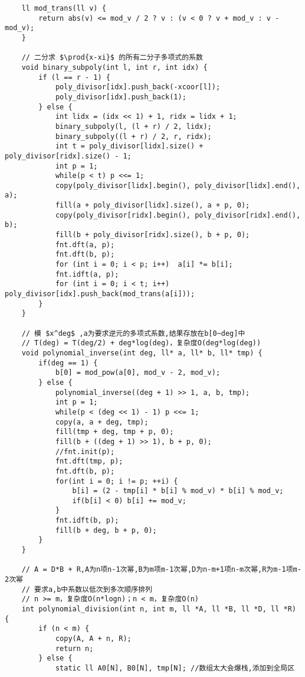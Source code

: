 \begin{verbatim}
    ll mod_trans(ll v) {
        return abs(v) <= mod_v / 2 ? v : (v < 0 ? v + mod_v : v - mod_v);
    }
    
    // 二分求 $\prod{x-xi}$ 的所有二分子多项式的系数
    void binary_subpoly(int l, int r, int idx) {
        if (l == r - 1) {
            poly_divisor[idx].push_back(-xcoor[l]);
            poly_divisor[idx].push_back(1);        
        } else {
            int lidx = (idx << 1) + 1, ridx = lidx + 1;
            binary_subpoly(l, (l + r) / 2, lidx);
            binary_subpoly((l + r) / 2, r, ridx);
            int t = poly_divisor[lidx].size() + poly_divisor[ridx].size() - 1;
            int p = 1;
            while(p < t) p <<= 1;
            copy(poly_divisor[lidx].begin(), poly_divisor[lidx].end(), a);
            fill(a + poly_divisor[lidx].size(), a + p, 0);
            copy(poly_divisor[ridx].begin(), poly_divisor[ridx].end(), b);
            fill(b + poly_divisor[ridx].size(), b + p, 0);
            fnt.dft(a, p);
            fnt.dft(b, p);
            for (int i = 0; i < p; i++)  a[i] *= b[i]; 
            fnt.idft(a, p);
            for (int i = 0; i < t; i++) poly_divisor[idx].push_back(mod_trans(a[i]));
        }
    }
    
    // 模 $x^deg$ ,a为要求逆元的多项式系数,结果存放在b[0~deg]中
    // T(deg) = T(deg/2) + deg*log(deg)，复杂度O(deg*log(deg))
    void polynomial_inverse(int deg, ll* a, ll* b, ll* tmp) {
        if(deg == 1) {
            b[0] = mod_pow(a[0], mod_v - 2, mod_v);
        } else {
            polynomial_inverse((deg + 1) >> 1, a, b, tmp);
            int p = 1;
            while(p < (deg << 1) - 1) p <<= 1;
            copy(a, a + deg, tmp);
            fill(tmp + deg, tmp + p, 0);
            fill(b + ((deg + 1) >> 1), b + p, 0);
            //fnt.init(p);
            fnt.dft(tmp, p);
            fnt.dft(b, p);
            for(int i = 0; i != p; ++i) {
                b[i] = (2 - tmp[i] * b[i] % mod_v) * b[i] % mod_v;
                if(b[i] < 0) b[i] += mod_v;
            }
            fnt.idft(b, p);
            fill(b + deg, b + p, 0);
        }
    }
    
    // A = D*B + R,A为n项n-1次幂,B为m项m-1次幂,D为n-m+1项n-m次幂,R为m-1项m-2次幂
    // 要求a,b中系数以低次到多次顺序排列
    // n >= m，复杂度O(n*logn)；n < m，复杂度O(n)
    int polynomial_division(int n, int m, ll *A, ll *B, ll *D, ll *R) {
        if (n < m) {
            copy(A, A + n, R);
            return n;
        } else {
            static ll A0[N], B0[N], tmp[N]; //数组太大会爆栈,添加到全局区
    

\end{verbatim}
